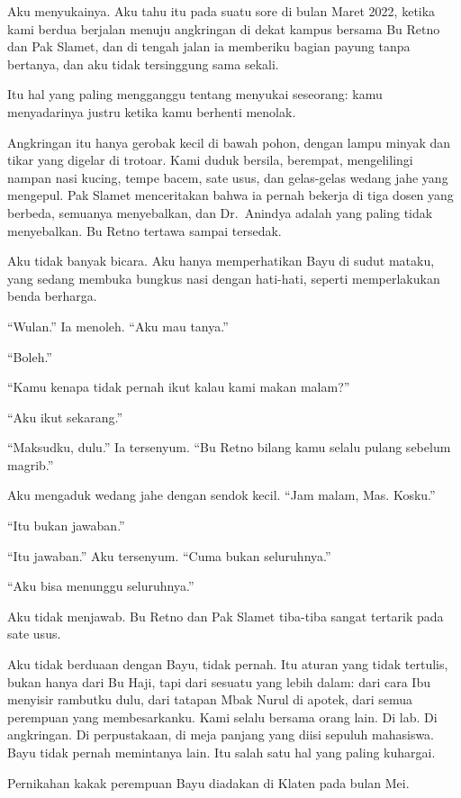 \documentclass[11pt,twoside,openany]{book}
\makeatletter
\newcommand{\scenebreak}{\par\vspace{0.9em}{\centering\textsc{*\hspace{0.7em}*\hspace{0.7em}*}\par}\vspace{0.9em}\@afterindentfalse\@afterheading}
\makeatother
\begin{document}
Aku menyukainya. Aku tahu itu pada suatu sore di bulan Maret 2022, ketika kami berdua berjalan menuju angkringan di dekat kampus bersama Bu Retno dan Pak Slamet, dan di tengah jalan ia memberiku bagian payung tanpa bertanya, dan aku tidak tersinggung sama sekali.

Itu hal yang paling mengganggu tentang menyukai seseorang: kamu menyadarinya justru ketika kamu berhenti menolak.

\scenebreak
Angkringan itu hanya gerobak kecil di bawah pohon, dengan lampu minyak dan tikar yang digelar di trotoar. Kami duduk bersila, berempat, mengelilingi nampan nasi kucing, tempe bacem, sate usus, dan gelas-gelas wedang jahe yang mengepul. Pak Slamet menceritakan bahwa ia pernah bekerja di tiga dosen yang berbeda, semuanya menyebalkan, dan Dr.~Anindya adalah yang paling tidak menyebalkan. Bu Retno tertawa sampai tersedak.

Aku tidak banyak bicara. Aku hanya memperhatikan Bayu di sudut mataku, yang sedang membuka bungkus nasi dengan hati-hati, seperti memperlakukan benda berharga.

``Wulan.'' Ia menoleh. ``Aku mau tanya.''

``Boleh.''

``Kamu kenapa tidak pernah ikut kalau kami makan malam?''

``Aku ikut sekarang.''

``Maksudku, dulu.'' Ia tersenyum. ``Bu Retno bilang kamu selalu pulang sebelum magrib.''

Aku mengaduk wedang jahe dengan sendok kecil. ``Jam malam, Mas. Kosku.''

``Itu bukan jawaban.''

``Itu jawaban.'' Aku tersenyum. ``Cuma bukan seluruhnya.''

``Aku bisa menunggu seluruhnya.''

Aku tidak menjawab. Bu Retno dan Pak Slamet tiba-tiba sangat tertarik pada sate usus.

Aku tidak berduaan dengan Bayu, tidak pernah. Itu aturan yang tidak tertulis, bukan hanya dari Bu Haji, tapi dari sesuatu yang lebih dalam: dari cara Ibu menyisir rambutku dulu, dari tatapan Mbak Nurul di apotek, dari semua perempuan yang membesarkanku. Kami selalu bersama orang lain. Di lab. Di angkringan. Di perpustakaan, di meja panjang yang diisi sepuluh mahasiswa. Bayu tidak pernah memintanya lain. Itu salah satu hal yang paling kuhargai.

\scenebreak
Pernikahan kakak perempuan Bayu diadakan di Klaten pada bulan Mei.
\end{document}
